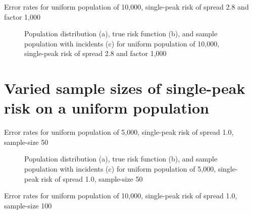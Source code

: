 {\begin{table}[H]

\caption[]{Error rates for uniform population of 10,000, single-peak risk of \gls{spread} 2.8 and \gls{factor} 1,000}
\label{tab:mean_error_rates:unif_1000_2.8_1h}
\end{table}

\begin{figure}[H]
    
    \caption[]{Population distribution (a), true risk function (b), and sample population with incidents (c) for uniform population of 10,000, single-peak risk of \gls{spread} 2.8 and \gls{factor} 1,000}
    \label{fig:distributions:unif_1000_2.8_1h}    
\end{figure} \newpage


\section{Varied sample sizes of single-peak risk on a uniform population}
\label{sec:app:results_unifXk_X_1.0_1h}


\begin{table}[H]
    
    \caption[]{Error rates for uniform population of 5,000, single-peak risk of \gls{spread} 1.0, sample-size 50}
    \label{tab:mean_error_rates:unif5k_50_1.0_1h}
\end{table}

\begin{figure}[H]
    
    \caption[]{Population distribution (a), true risk function (b), and sample population with incidents (c) for uniform population of 5,000, single-peak risk of \gls{spread} 1.0, sample-size 50}
    \label{fig:distributions:unif5k_50_1.0_1h}    
\end{figure} \newpage


\begin{table}[H]
    
    \caption[]{Error rates for uniform population of 10,000, single-peak risk of \gls{spread} 1.0, sample-size 100}
    \label{tab:mean_error_rates:unif10k_100_1.0_1h}
\end{table}

}
